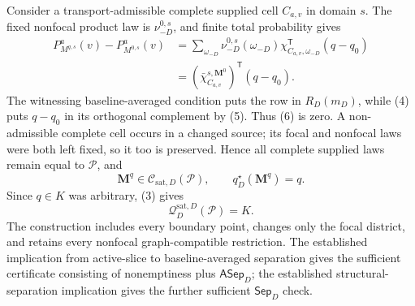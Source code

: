 Consider a transport-admissible complete supplied cell \(C_{a,v}\) in domain \(s\).  The fixed nonfocal product law is \(\nu_{-D}^{0,s}\), and finite total probability gives
\[
\begin{aligned}
P_{M^{q,s}}^a(v)-P_{M^{0,s}}^a(v)
&=\sum_{\omega_{-D}}\nu_{-D}^{0,s}(\omega_{-D})
\chi_{C_{a,v},\omega_{-D}}^{\mathsf T}(q-q_0)\\
&=(\bar\chi_{C_{a,v}}^{s,\mathbf M^0})^{\mathsf T}(q-q_0).
\end{aligned}
\tag{6}
\]
The witnessing baseline-averaged condition puts the row in \(R_D(m_D)\), while (4) puts \(q-q_0\) in its orthogonal complement by (5).  Thus (6) is zero.  A non-admissible complete cell occurs in a changed source; its focal and nonfocal laws were both left fixed, so it too is preserved.  Hence all complete supplied laws remain equal to \(\mathcal P\), and
\[
\mathbf M^q\in\mathcal C_{\mathrm{sat},D}(\mathcal P),
\qquad q_D^\star(\mathbf M^q)=q.
\]
Since \(q\in K\) was arbitrary, (3) gives
\[
\mathcal Q_D^{\mathrm{sat},D}(\mathcal P)=K.
\]
The construction includes every boundary point, changes only the focal district, and retains every nonfocal graph-compatible restriction.  The established implication from active-slice to baseline-averaged separation gives the sufficient certificate consisting of nonemptiness plus \(\mathsf{ASep}_D\); the established structural-separation implication gives the further sufficient \(\mathsf{Sep}_D\) check.